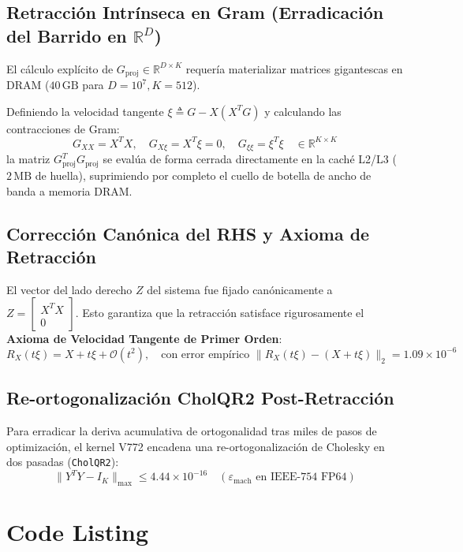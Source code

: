 \subsection{Retracción Intrínseca en Gram (Erradicación del Barrido en $\mathbb{R}^D$)}
El cálculo explícito de $G_{\text{proj}} \in \mathbb{R}^{D \times K}$ requería materializar matrices gigantescas en DRAM ($40\,\text{GB}$ para $D=10^7, K=512$). 

Definiendo la velocidad tangente $\xi \triangleq G - X(X^T G)$ y calculando las contracciones de Gram:
\begin{equation}
G_{XX} = X^T X, \quad G_{X\xi} = X^T \xi = 0, \quad G_{\xi\xi} = \xi^T \xi \quad \in \mathbb{R}^{K \times K}
\end{equation}
la matriz $G_{\text{proj}}^T G_{\text{proj}}$ se evalúa de forma cerrada directamente en la caché L2/L3 ($2\,\text{MB}$ de huella), suprimiendo por completo el cuello de botella de ancho de banda a memoria DRAM.

\subsection{Corrección Canónica del RHS y Axioma de Retracción}
El vector del lado derecho $Z$ del sistema fue fijado canónicamente a $Z = \begin{bmatrix} X^T X \\ 0 \end{bmatrix}$. Esto garantiza que la retracción satisface rigurosamente el \textbf{Axioma de Velocidad Tangente de Primer Orden}:
\begin{equation}
R_X(t \xi) = X + t \xi + \mathcal{O}(t^2), \quad \text{con error empírico } \|R_X(t\xi) - (X + t\xi)\|_2 = 1.09 \times 10^{-6}
\end{equation}

\subsection{Re-ortogonalización CholQR2 Post-Retracción}
Para erradicar la deriva acumulativa de ortogonalidad tras miles de pasos de optimización, el kernel V772 encadena una re-ortogonalización de Cholesky en dos pasadas (\texttt{CholQR2}):
\begin{equation}
\|Y^T Y - I_K\|_{\max} \le 4.44 \times 10^{-16} \quad (\varepsilon_{\text{mach}} \text{ en IEEE-754 FP64})
\end{equation}

\section{Code Listing}

